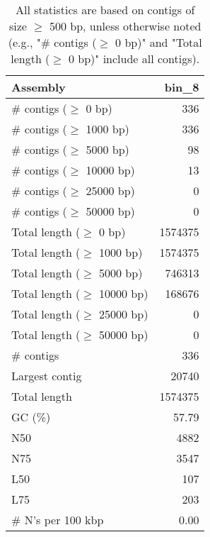 \documentclass[12pt,a4paper]{article}
\begin{document}
\begin{table}[ht]
\begin{center}
\caption{All statistics are based on contigs of size $\geq$ 500 bp, unless otherwise noted (e.g., "\# contigs ($\geq$ 0 bp)" and "Total length ($\geq$ 0 bp)" include all contigs).}
\begin{tabular}{|l*{1}{|r}|}
\hline
Assembly & bin\_8 \\ \hline
\# contigs ($\geq$ 0 bp) & 336 \\ \hline
\# contigs ($\geq$ 1000 bp) & 336 \\ \hline
\# contigs ($\geq$ 5000 bp) & 98 \\ \hline
\# contigs ($\geq$ 10000 bp) & 13 \\ \hline
\# contigs ($\geq$ 25000 bp) & 0 \\ \hline
\# contigs ($\geq$ 50000 bp) & 0 \\ \hline
Total length ($\geq$ 0 bp) & 1574375 \\ \hline
Total length ($\geq$ 1000 bp) & 1574375 \\ \hline
Total length ($\geq$ 5000 bp) & 746313 \\ \hline
Total length ($\geq$ 10000 bp) & 168676 \\ \hline
Total length ($\geq$ 25000 bp) & 0 \\ \hline
Total length ($\geq$ 50000 bp) & 0 \\ \hline
\# contigs & 336 \\ \hline
Largest contig & 20740 \\ \hline
Total length & 1574375 \\ \hline
GC (\%) & 57.79 \\ \hline
N50 & 4882 \\ \hline
N75 & 3547 \\ \hline
L50 & 107 \\ \hline
L75 & 203 \\ \hline
\# N's per 100 kbp & 0.00 \\ \hline
\end{tabular}
\end{center}
\end{table}
\end{document}
